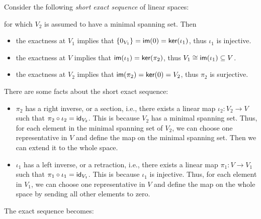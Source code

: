 \begin{example}
  Consider the following \emph{short exact sequence} of linear spaces:
  \begin{center}
  \end{center}
  for which $V_2$ is assumed to have a minimal spanning set. Then
  \begin{itemize}
    \item the exactness at $V_1$ implies that $\{0_{V_1}\} = \operatorname{\text{\normalfont\sffamily im}}(0) = \operatorname{\text{\normalfont\sffamily ker}}(\iota_1)$, thus $\iota_1$ is injective.
    \item the exactness at $V$ implies that $\operatorname{\text{\normalfont\sffamily im}}(\iota_1) = \operatorname{\text{\normalfont\sffamily ker}}(\pi_2)$, thus $V_1 \cong \operatorname{\text{\normalfont\sffamily im}}(\iota_1) \subseteq V$.
    \item the exactness at $V_2$ implies that $\operatorname{\text{\normalfont\sffamily im}}(\pi_2) = \operatorname{\text{\normalfont\sffamily ker}}(0) = V_2$, thus $\pi_2$ is surjective.
  \end{itemize}

  There are some facts about the short exact sequence:
  \begin{itemize}
    \item $\pi_2$ has a right inverse, or a section, i.e., there exists a linear map $\iota_2 \colon V_2 \to V$ such that $\pi_2 \circ \iota_2 = \operatorname{\text{\normalfont\sffamily id}}_{V_2}$. This is because $V_2$ has a minimal spanning set. Thus, for each element in the minimal spanning set of $V_2$, we can choose one representative in $V$ and define the map on the minimal spanning set. Then we can extend it to the whole space.

    \item $\iota_1$ has a left inverse, or a retraction, i.e., there exists a linear map $\pi_1 \colon V \to V_1$ such that $\pi_1 \circ \iota_1 = \operatorname{\text{\normalfont\sffamily id}}_{V_1}$. This is because $\iota_1$ is injective. Thus, for each element in $V_1$, we can choose one representative in $V$ and define the map on the whole space by sending all other elements to zero.
  \end{itemize}

  The exact sequence becomes:
  \begin{center}
  \end{center}
\end{example}


